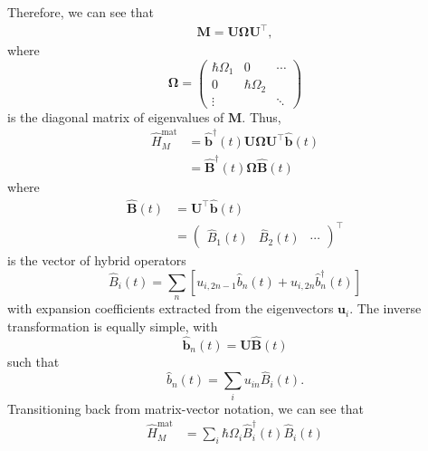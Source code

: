 \documentclass{article}
\begin{document}
Therefore, we can see that
\begin{equation}
\begin{split}
\mathbf{M} = \mathbf{U}\bm{\Omega}\mathbf{U}^\top,
\end{split}
\end{equation}
where
\begin{equation}
\bm{\Omega} = 
\begin{pmatrix}
\hbar\Omega_1 & 0 & \cdots\\
0 & \hbar\Omega_2 &\\
\vdots & & \ddots
\end{pmatrix}
\end{equation}
is the diagonal matrix of eigenvalues of $\mathbf{M}$. Thus, 
\begin{equation}
\begin{split}
\hat{H}_M^\mathrm{mat} &= \hat{\mathbf{b}}^\dagger(t)\mathbf{U}\bm{\Omega}\mathbf{U}^\top\hat{\mathbf{b}}(t)\\
&= \hat{\mathbf{B}}^\dagger(t)\bm{\Omega}\hat{\mathbf{B}}(t)
\end{split}
\end{equation}
where
\begin{equation}
\begin{split}
\hat{\mathbf{B}}(t) &= \mathbf{U}^\top\hat{\mathbf{b}}(t)\\
&= 
\begin{pmatrix}
\hat{B}_1(t) & \hat{B}_2(t) & \cdots
\end{pmatrix}^\top
\end{split}
\end{equation}
is the vector of hybrid operators
\begin{equation}
\hat{B}_i(t) = \sum_n\left[u_{i,2n-1}\hat{b}_n(t) + u_{i,2n}\hat{b}_n^\dagger(t)\right]
\end{equation}
with expansion coefficients extracted from the eigenvectors $\mathbf{u}_i$. The inverse transformation is equally simple, with
\begin{equation}
\hat{\mathbf{b}}_n(t) = \mathbf{U}\hat{\mathbf{B}}(t)
\end{equation}
such that
\begin{equation}
\hat{b}_n(t) = \sum_iu_{in}\hat{B}_i(t).
\end{equation}
Transitioning back from matrix-vector notation, we can see that
\begin{equation}
\begin{split}
\hat{H}_M^\mathrm{mat} &= \sum_i\hbar\Omega_i\hat{B}_i^\dagger(t)\hat{B}_i(t)
\end{split}
\end{equation}
\end{document}
